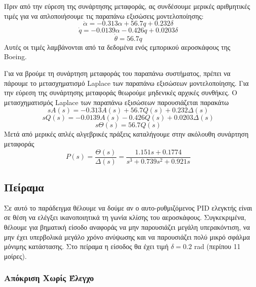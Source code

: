 Πριν από την εύρεση της συνάρτησης μεταφοράς, ας συνδέσουμε μερικές αριθμητικές τιμές για να απλοποιήσουμε τις παραπάνω εξισώσεις μοντελοποίησης:
\begin{equation}
\dot{\alpha} = -0.313\alpha + 56.7q + 0.232\delta
\end{equation}
\begin{equation}
\dot{q} = -0.0139\alpha - 0.426q + 0.0203\delta
\end{equation}
\begin{equation}
\dot{\theta} = 56.7q
\end{equation}
Αυτές οι τιμές λαμβάνονται από τα δεδομένα ενός εμπορικού αεροσκάφους της Boeing.

Για να βρούμε τη συνάρτηση μεταφοράς του παραπάνω συστήματος, πρέπει να πάρουμε το μετασχηματισμό Laplace των παραπάνω εξισώσεων μοντελοποίησης. Για την εύρεση της συνάρτησης μεταφοράς θεωρούμε μηδενικές αρχικές συνθήκες. Ο μετασχηματισμός Laplace των παραπάνω εξισώσεων παρουσιάζεται παρακάτω
\begin{equation}
sA(s)=-0.313A(s)+56.7Q(s)+0.232\Delta(s)
\end{equation}
\begin{equation}
sQ(s)=-0.0139A(s)-0.426Q(s)+0.0203\Delta(s)
\end{equation}
\begin{equation}
s\Theta(s) = 56.7Q(s)
\end{equation}
Μετά από μερικές απλές αλγεβρικές πράξεις καταλήγουμε στην ακόλουθη συνάρτηση μεταφοράς
\begin{equation}
P(s) = \frac{\Theta(s)}{\Delta(s)} = \frac{1.151s+0.1774}{s^3+0.739s^2+0.921s}
\label{eq:aircraft_tf}
\end{equation}

\subsection{Πείραμα}

Σε αυτό το παράδειγμα θέλουμε να δούμε αν ο αυτο-ρυθμιζόμενος PID ελεγκτής είναι σε θέση να ελέγξει ικανοποιητικά τη γωνία κλίσης του αεροσκάφους. Συγκεκριμένα, θέλουμε για βηματική είσοδο αναφοράς να μην παρουσιάζει μεγάλη υπερακόντιση, να μην έχει υπερβολικά μεγάλο χρόνο ανύψωσης και να παρουσιάζει πολύ μικρό σφάλμα μόνιμης κατάστασης. Στο πείραμα η είσοδος θα έχει τιμή $\delta=0.2$ rad (περίπου 11 μοίρες).

\subsubsection{Απόκριση Χωρίς Έλεγχο}

